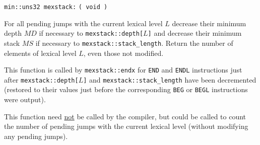 \documentclass[12pt]{article}
\begin{document}
\verb|min::uns32 mexstack:|  \verb|( void )|
\begin{indpar}
For all pending jumps with the current lexical level $L$ decrease
their minimum depth $MD$ if necessary to {\tt mexstack::depth[$L$]}
and decrease their minimum stack $MS$ if necessary to 
{\tt mexstack::stack\_length}.  Return the number of elements
of lexical level $L$, even those not modified.

This function is called by {\tt mexstack::endx} for {\tt END} and
{\tt ENDL} instructions just after {\tt mexstack::depth[$L$]}
and {\tt mexstack::stack\_length} have been decremented
(restored to their values just before the corresponding {\tt BEG} or
{\tt BEGL} instructions were output).

This function need \underline{not} be called by the compiler, but
could be called to count the number of pending jumps with the
current lexical level (without modifying any pending jumps).
\end{indpar}

\clearpage

\printindex
\end{document}

